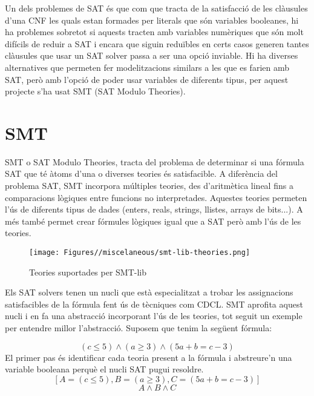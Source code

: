 Un dels problemes de SAT és que com que tracta de la satisfacció de les clàusules d'una CNF les quals estan formades per literals que són variables booleanes, hi ha problemes sobretot si aquests tracten amb variables numèriques que són molt difícils de reduir a SAT i encara que siguin reduïbles en certs casos generen tantes clàusules que usar un SAT solver passa a ser una opció inviable. Hi ha diverses alternatives que permeten fer modelitzacions similars a les que es farien amb SAT, però amb l'opció de poder usar variables de diferents tipus, per aquest projecte s'ha usat SMT (SAT Modulo Theories).

\section{SMT}
SMT o SAT Modulo Theories, tracta del problema de determinar si una fórmula SAT que té àtoms d'una o diverses teories és satisfacible. A diferència del problema SAT, SMT incorpora múltiples teories, des d'aritmètica lineal fins a comparacions lògiques entre funcions no interpretades. Aquestes teories permeten l'ús de diferents tipus de dades (enters, reals, strings, llistes, arrays de bits...). A més també permet crear fórmules lògiques igual que a SAT però amb l'ús de les teories.\\
\begin{figure}
    \centering
    \texttt{[image: Figures//miscelaneous/smt-lib-theories.png]}
    \caption{Teories suportades per SMT-lib \cite{SMT-solving}}
    \label{fig:smt-theories}
\end{figure}

Els SAT solvers tenen un nucli que està especialitzat a trobar les assignacions satisfacibles de la fórmula fent ús de tècniques com CDCL. SMT aprofita aquest nucli i en fa una abstracció incorporant l'ús de les teories, tot seguit un exemple per entendre millor l'abstracció.
Suposem que tenim la següent fórmula:

$$ (c \le 5) \land (a \geq 3) \land (5a+b=c-3) $$
El primer pas és identificar cada teoria present a la fórmula i abstreure'n una variable booleana perquè el nucli SAT pugui resoldre.\\
$$ [A=(c \le 5), B=(a \geq 3), C=(5a+b=c-3)] $$
$$ A \land B \land C $$

